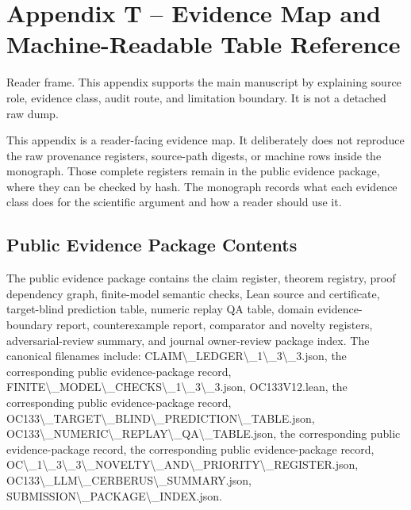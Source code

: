 \section{Appendix T -- Evidence Map and Machine-Readable Table Reference}
Reader frame. This appendix supports the main manuscript by explaining source role, evidence class, audit route, and limitation boundary. It is not a detached raw dump.


\label{app:oc133-source-to-pdf-trace}

This appendix is a reader-facing evidence map. It deliberately does not reproduce the raw provenance registers, source-path digests, or machine rows inside the monograph. Those complete registers remain in the public evidence package, where they can be checked by hash. The monograph records what each evidence class does for the scientific argument and how a reader should use it.


\subsection{Public Evidence Package Contents}

The public evidence package contains the claim register, theorem registry, proof dependency graph, finite-model semantic checks, Lean source and certificate, target-blind prediction table, numeric replay QA table, domain evidence-boundary report, counterexample report, comparator and novelty registers, adversarial-review summary, and journal owner-review package index. The canonical filenames include: CLAIM\textbackslash{}\_LEDGER\textbackslash{}\_1\textbackslash{}\_3\textbackslash{}\_3.json, the corresponding public evidence-package record, FINITE\textbackslash{}\_MODEL\textbackslash{}\_CHECKS\textbackslash{}\_1\textbackslash{}\_3\textbackslash{}\_3.json, OC133V12.lean, the corresponding public evidence-package record, OC133\textbackslash{}\_TARGET\textbackslash{}\_BLIND\textbackslash{}\_PREDICTION\textbackslash{}\_TABLE.json, OC133\textbackslash{}\_NUMERIC\textbackslash{}\_REPLAY\textbackslash{}\_QA\textbackslash{}\_TABLE.json, the corresponding public evidence-package record, the corresponding public evidence-package record, OC\textbackslash{}\_1\textbackslash{}\_3\textbackslash{}\_3\textbackslash{}\_NOVELTY\textbackslash{}\_AND\textbackslash{}\_PRIORITY\textbackslash{}\_REGISTER.json, OC133\textbackslash{}\_LLM\textbackslash{}\_CERBERUS\textbackslash{}\_SUMMARY.json, SUBMISSION\textbackslash{}\_PACKAGE\textbackslash{}\_INDEX.json.


